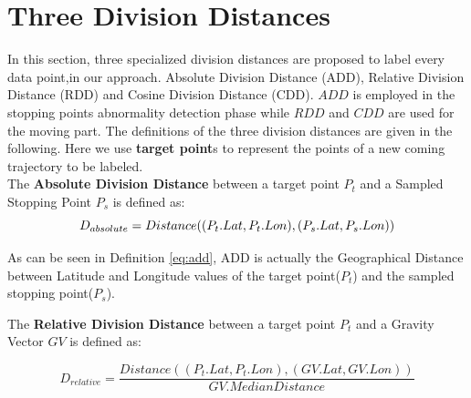 \documentclass[12pt,glossary]{dalcsthesis}
\begin{document}
\section{Three Division Distances}
\label{sec:three_division_distances}

In this section,  three specialized division distances are proposed to label every data point,in our approach.  Absolute Division Distance (ADD), Relative Division Distance (RDD) and Cosine Division Distance (CDD). $ADD$ is employed in the stopping points abnormality detection phase while $RDD$ and $CDD$ are used for the moving part. The definitions of the three division distances are given in the following. Here we use \textbf{target point}s to represent the points of a new coming trajectory to be labeled.\\

The \textbf{Absolute Division Distance} between a target point $P_t$ and a Sampled Stopping Point $P_s$ is defined as:
\begin{equation}
\label{eq:add}
D_{absolute} = \\
Distance((P_t.Lat,P_t.Lon),(P_s.Lat,P_s.Lon))
\end{equation}



As can be seen in Definition \ref{eq:add}, ADD is actually the Geographical Distance \cite{gpsDistance} between %
Latitude and Longitude values of the target point($P_t$) and the sampled stopping point($P_s$). %

The \textbf{Relative Division Distance} between a target point $P_t$ and a Gravity Vector $GV$ is defined as:

\begin{equation}
\label{eq:rdd}
D_{relative} = \frac{Distance((P_t.Lat,P_t.Lon),(GV.Lat,GV.Lon))}{GV.MedianDistance}
\end{equation}

\end{document}
